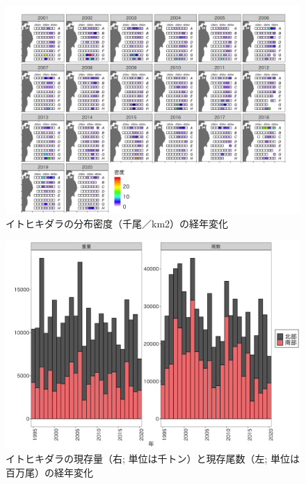 \documentclass[11pt]{article} %
\begin{document}
\begin{linenumbers}
\begin{figure}[h]
  \centering
  \includegraphics[width = 14cm]{イトヒキダラdens.png}
  \caption{イトヒキダラの分布密度（千尾／km2）の経年変化}
\end{figure}

\begin{figure}[h]
  \centering
  \includegraphics[width = 14cm]{イトヒキダラtrend.png}
  \caption{イトヒキダラの現存量（右; 単位は千トン）と現存尾数（左; 単位は百万尾）の経年変化}
\end{figure}


\end{linenumbers}
\end{document}
